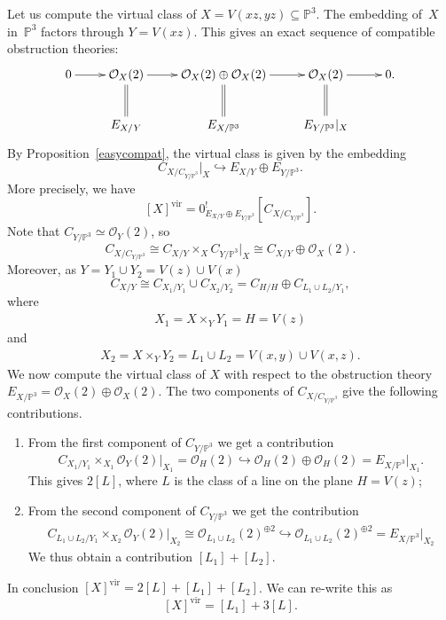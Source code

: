 \documentclass[pdftex]{sigma}
\numberwithin{equation}{section}
\newcommand{\vv}{\mathrm{vir}}
\newcommand{\OO}{\mathcal{O}}
\newcommand{\PP}{\mathbb P}
\begin{document}
\begin{Example}\label{mainexample}
Let us compute the virtual class of $X=V(xz,yz)\subseteq\PP^3$. The embedding of~$X$ in~$\PP^3$ factors through $Y=V(xz)$. This gives an exact sequence of compatible obstruction theories:
\[\xymatrix{0\ar[r] &\OO_X(2)\ar[r]\ar@{=}[d] &\OO_X(2)\oplus\OO_X(2)\ar[r]\ar@{=}[d] &\OO_X(2)\ar[r]\ar@{=}[d] &0.\\
& E_{X/Y} &E_{X/\PP^3} &E_{Y/\PP^3}\rvert_X}\]
By Proposition~\ref{easycompat}, the virtual class is given by the embedding
\[C_{X/C_{Y/\PP^3}}\rvert_X\hookrightarrow E_{X/Y}\oplus E_{Y/\PP^3}.\]
More precisely, we have
\[[X]^{\vv}=0^!_{E_{X/Y}\oplus E_{Y/\PP^3}}[C_{X/C_{Y/\PP^3}}].
\]
Note that $C_{Y/\PP^3}\simeq\OO_Y(2)$, so
\[
C_{X/C_{Y/\PP^3}}\cong C_{X/Y}\times_X C_{Y/\PP^3}\rvert_X \cong C_{X/Y}\oplus \OO_X(2).
\]
Moreover, as $Y=Y_1\cup Y_2=V(z)\cup V(x)$
\[C_{X/Y}\cong C_{X_1/Y_1} \cup C_{X_2/Y_2}=C_{H/H}\oplus C_{L_1\cup L_2/Y_1},\]
where \begin{gather*}X_1=X\times_Y Y_1=H=V(z)\end{gather*} and
\begin{gather*}X_2=X\times_Y Y_2=L_1\cup L_2=V(x,y)\cup V(x,z).\end{gather*}
We now compute the virtual class of $X$ with respect to the obstruction theory $E_{X/\PP^3}=\OO_X(2)\oplus \OO_X(2)$. The two components of $C_{X/C_{Y/\PP^3}}$ give the following contributions.
\begin{enumerate}\itemsep=0pt
\item From the first component of $C_{Y/\PP^3}$ we get a contribution
\[C_{X_1/Y_1}\times_{X_1}\OO_{Y}(2)\rvert_{X_1}=\OO_H(2)\hookrightarrow \OO_H(2)\oplus \OO_H(2)=E_{X/\PP^3}\rvert_{X_1} .\]
 This gives $2[L]$, where $L$ is the class of a line on the plane $H=V(z)$;
\item From the second component of $C_{Y/\PP^3}$ we get the contribution
\begin{align*}C_{L_1\cup L_2/Y_1}\times_{X_2}\OO_Y(2)\rvert_{X_2}\cong \OO_{L_1\cup L_2}(2)^{\oplus 2}\hookrightarrow \OO_{L_1\cup L_2}(2)^{\oplus 2} =E_{X/\PP^3}\rvert_{X_2}
\end{align*}
 We thus obtain a contribution $[L_1]+[L_2]$.
\end{enumerate}
In conclusion $[X]^{\vv}=2[L]+[L_1]+[L_2]$. We can re-write this as
\[[X]^{\vv}=[L_1]+3[L].\]
\end{Example}
\end{document}
